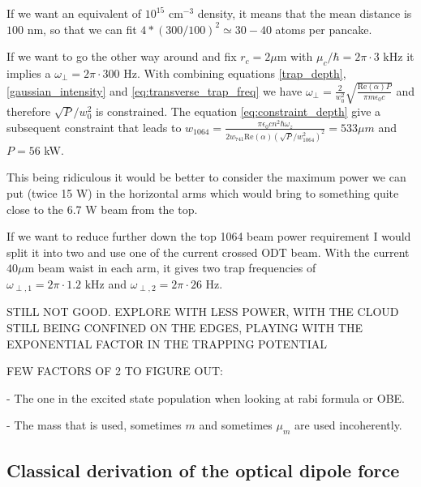 \documentclass[reprint,amsmath,amssymb,aps,nofootinbib]{revtex4-1}
\begin{document}
If we want an equivalent of $10^{15} \text{ cm}^{-3}$ density, it means that the mean distance is $100\text{ nm}$, so that we can fit $4*(300/100)^{2} \simeq 30-40$ atoms per pancake.

If we want to go the other way around and fix $r_{c} = 2\mu\text{m}$ with $\mu_{c}/\hbar = 2\pi\cdot 3\text{ kHz}$ it implies a $\omega_{\perp} = 2\pi\cdot 300\text{ Hz}$. With combining equations \ref{trap_depth}, \ref{gaussian_intensity} and \ref{eq:transverse_trap_freq} we have $\omega_{\perp} = \frac{2}{w_{0}^{2}}\sqrt{\frac{\text{Re}(\alpha)P}{\pi m\epsilon_{0}c}}$ and therefore $\sqrt{P}/w_{0}^{2}$ is constrained. The equation \ref{eq:constraint_depth} give a subsequent constraint that leads to $w_{1064} = \frac{\pi\epsilon_{0}cn^{2}\hbar\omega_{z}}{2w_{741} \text{Re}(\alpha) (\sqrt{P}/w_{1064}^{2})^{2}}=533\mu m$ and $P = 56$ kW.

This being ridiculous it would be better to consider the maximum power we can put (twice 15 W) in the horizontal arms which would bring to something quite close to the 6.7 W beam from the top.

If we want to reduce further down the top 1064 beam power requirement I would split it into two and use one of the current crossed ODT beam. With the current $40\mu$m beam waist in each arm, it gives two trap frequencies of $\omega_{\perp, 1} = 2\pi\cdot 1.2\text{ kHz}$ and $\omega_{\perp, 2} = 2\pi\cdot 26\text{ Hz}$.

STILL NOT GOOD. EXPLORE WITH LESS POWER, WITH THE CLOUD STILL BEING CONFINED ON THE EDGES, PLAYING WITH THE EXPONENTIAL FACTOR IN THE TRAPPING POTENTIAL

FEW FACTORS OF 2 TO FIGURE OUT:

- The one in the excited state population when looking at rabi formula or OBE.

- The mass that is used, sometimes $m$ and sometimes $\mu_{m}$ are used incoherently.
\break

\pagebreak

\subsection{Classical derivation of the optical dipole force\label{app:dipole_force}}
\end{document}
